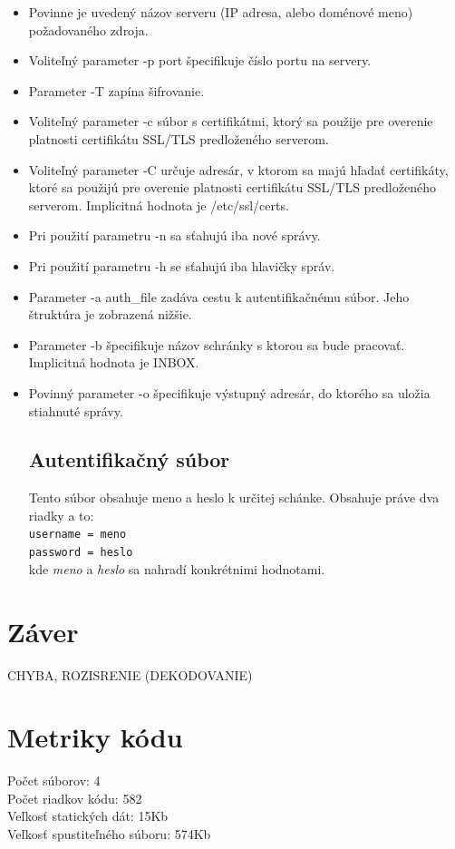 \documentclass{article}
\begin{document}
\begin{itemize}
\item Povinne je uvedený názov serveru (IP adresa, alebo doménové meno) požadovaného zdroja.
\item    Voliteľný parameter -p port špecifikuje číslo portu na servery.
\item    Parameter -T zapína šifrovanie.
\item    Voliteľný parameter -c súbor s certifikátmi, ktorý sa použije pre overenie platnosti certifikátu SSL/TLS predloženého serverom.
\item    Voliteľný parameter -C určuje adresár, v ktorom sa majú hľadať certifikáty, ktoré sa použijú pre overenie platnosti certifikátu SSL/TLS predloženého serverom. Implicitná hodnota je /etc/ssl/certs.
\item    Pri použití parametru -n sa sťahujú iba nové správy.
\item    Pri použití parametru -h se sťahujú iba hlavičky správ.
\item    Parameter -a auth\_file zadáva cestu k autentifikačnému súbor. Jeho štruktúra je zobrazená nižšie.
\item    Parameter -b špecifikuje názov schránky s ktorou sa bude pracovať. Implicitná hodnota je INBOX.
\item    Povinný parameter -o špecifikuje výstupný adresár, do ktorého sa uložia stiahnuté správy.

\subsection{Autentifikačný súbor}
Tento súbor obsahuje meno a heslo k určitej schánke. Obsahuje práve dva riadky a to:\\
\texttt{username = meno\\
password = heslo}\\
kde \textit{meno} a \textit{heslo} sa nahradí konkrétnimi hodnotami.

\end{itemize}
\section{Záver}
CHYBA, ROZISRENIE (DEKODOVANIE)\\
\section{Metriky kódu}
Počet súborov:      4\\
Počet riadkov kódu: 582\\
Veľkosť statických dát: 15Kb\\
Veľkosť spustiteľného súboru:  574Kb\\
\end{document}
